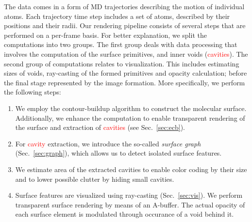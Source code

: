 The data comes in a form of MD trajectories describing the motion of individual atoms. 
Each trajectory time step includes a set of atoms, described by their positions and their radii. 
Our rendering pipeline consists of several steps that are performed on a per-frame basis. 
For better explanation, we split the computations into two groups. 
The first group deals with data processing that involves the computation of the surface primitives, and inner voids (\textcolor{red}{cavities}).
The second group of computations relates to visualization. 
This includes estimating sizes of voids, ray-casting of the formed primitives and opacity calculation; before the final stage represented by the image formation. More specifically, we perform the following steps:
	\begin{enumerate}
	  \item We employ the contour-buildup algorithm to construct the molecular surface. Additionally, we enhance the computation to enable transparent rendering of the surface and extraction of \textcolor{red}{cavities} (see Sec.~\ref{sec:ecb}).
		\item For \textcolor{red}{cavity} extraction, we introduce the so-called \textit{surface graph} (Sec.~\ref{sec:graph}), which allows us to detect isolated surface features.
		\item We estimate area of the extracted cavities to enable color coding by their size and to lower possible clutter by hiding small cavities.
		\item Surface features are visualized using ray-casting (Sec.~\ref{sec:vis}). We perform transparent surface rendering by means of an A-buffer. The actual opacity of each surface element is modulated through occurance of a void behind it.
	\end{enumerate}